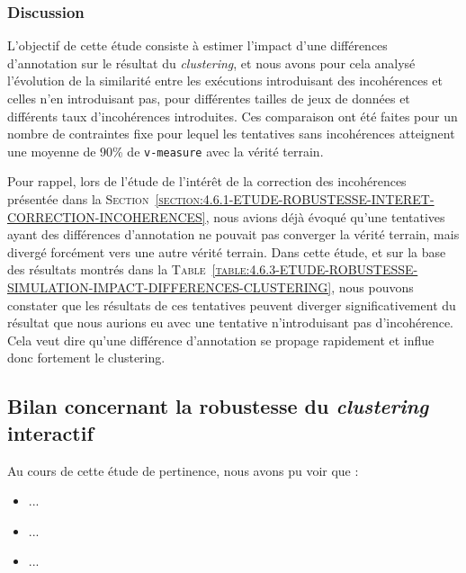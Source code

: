 		\subsubsection{Discussion}
		
			L'objectif de cette étude consiste à estimer l'impact d'une différences d'annotation sur le résultat du \textit{clustering}, et nous avons pour cela analysé l'évolution de la similarité entre les exécutions introduisant des incohérences et celles n'en introduisant pas, pour différentes tailles de jeux de données et différents taux d'incohérences introduites.
			Ces comparaison ont été faites pour un nombre de contraintes fixe pour lequel les tentatives sans incohérences atteignent une moyenne de $90$\% de \texttt{v-measure} avec la vérité terrain.
		
			Pour rappel, lors de l'étude de l'intérêt de la correction des incohérences présentée dans la \textsc{Section~\ref{section:4.6.1-ETUDE-ROBUSTESSE-INTERET-CORRECTION-INCOHERENCES}}, nous avions déjà évoqué qu'une tentatives ayant des différences d'annotation ne pouvait pas converger la vérité terrain, mais divergé forcément vers une autre vérité terrain. 
			Dans cette étude, et sur la base des résultats montrés dans la \textsc{Table~\ref{table:4.6.3-ETUDE-ROBUSTESSE-SIMULATION-IMPACT-DIFFERENCES-CLUSTERING}}, nous pouvons constater que les résultats de ces tentatives peuvent diverger significativement du résultat que nous aurions eu avec une tentative n'introduisant pas d'incohérence.
			Cela veut dire qu'une différence d'annotation se propage rapidement et influe donc fortement le clustering.
			
			
		
		
	\subsection{Bilan concernant la robustesse du \textit{clustering} interactif}
	\label{section:4.6.4-ETUDE-ROBUSTESSE-MISE-EN-COMMUN}
	
	
		\begin{leftBarSummary}
			Au cours de cette étude de pertinence, nous avons pu voir que :
			\begin{itemize}
				\item[\itemok] ...
				\item[\itemok] ...
				\item[\itemok] ...
			\end{itemize}
		\end{leftBarSummary}